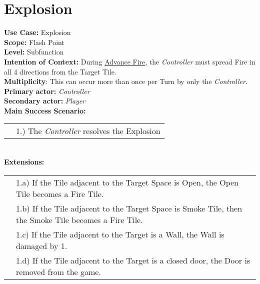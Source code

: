 \documentclass{article}
\begin{document}
	\section*{Explosion}
	\textbf{Use Case:} Explosion\\
	\textbf{Scope:} Flash Point\\
	\textbf{Level:} Subfunction\\
	\textbf{Intention of Context:} During \underline{Advance Fire}, the \textit{Controller} must spread Fire in all 4 directions from the Target Tile.\\
	\textbf{Multiplicity}: This can occur more than once per Turn by only the \textit{Controller}.\\
	\textbf{Primary actor:} \textit{Controller}\\
	\textbf{Secondary actor:} \textit{Player}\\
	\textbf{Main Success Scenario:}\\
	\begin{tabular}{l l}
		&1.) The \textit{Controller} resolves the Explosion\\
	\end{tabular}\\
	\textbf{Extensions: }\\
	\begin{tabular}{l l}
		&1.a) If the Tile adjacent to the Target Space is Open, the Open Tile becomes a Fire Tile.\\
		&1.b) If the Tile adjacent to the Target Space is Smoke Tile, then the Smoke Tile becomes a Fire Tile.\\
		&1.c) If the Tile adjacent to the Target is a Wall, the Wall is damaged by 1. \\
		&1.d) If the Tile adjacent to the Target is a closed door, the Door is removed from the game.\\
	\end{tabular}\\
\end{document}
